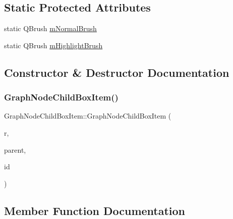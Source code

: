 \subsection*{Static Protected Attributes}
\begin{DoxyCompactItemize}
\item 
static Q\+Brush \mbox{\hyperlink{class_graph_node_child_box_item_a0040468ac7b2f766cb4eab82e85c9736}{m\+Normal\+Brush}}
\item 
static Q\+Brush \mbox{\hyperlink{class_graph_node_child_box_item_a90f1a634785dc329ffef3e62b0098c5d}{m\+Highlight\+Brush}}
\end{DoxyCompactItemize}


\subsection{Constructor \& Destructor Documentation}
\mbox{\label{class_graph_node_child_box_item_a7057ac6ca195d382d49d207b3528f59a}} 
\subsubsection{\texorpdfstring{GraphNodeChildBoxItem()}{GraphNodeChildBoxItem()}}
{\footnotesize\ttfamily Graph\+Node\+Child\+Box\+Item\+::\+Graph\+Node\+Child\+Box\+Item (\begin{DoxyParamCaption}\item[{Q\+RectF}]{r,  }\item[{\mbox{\hyperlink{class_graph_node_item}{Graph\+Node\+Item}} $\ast$}]{parent,  }\item[{int}]{id }\end{DoxyParamCaption})\hspace{0.3cm}{\ttfamily [explicit]}}



\subsection{Member Function Documentation}
\mbox{\label{class_graph_node_child_box_item_a06a22cbe36ce6112f4580dc9ed03524e}} 
